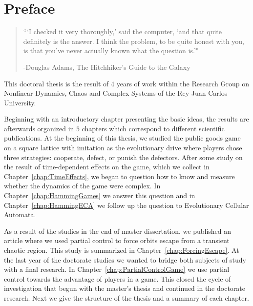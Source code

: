 \chapter*{Preface}


\begin{quotation}

\begin{flushright}
\begin{minipage}[t][5cm][b]{0.5\textwidth}
{ ```I checked it very thoroughly,' said the computer, `and that quite definitely is the answer. I think the
problem, to be quite honest with you, is that you've never actually known what the question is.'"}

\bigskip

-{\small  Douglas Adams, The Hitchhiker’s Guide to the Galaxy}
\end{minipage}
\end{flushright}

\vspace{0.5cm}
\end{quotation}

This doctoral thesis is the result of $4$ years of work within the Research Group on Nonlinear Dynamics, Chaos and Complex Systems of the Rey Juan Carlos University.

Beginning with an introductory chapter presenting the basic ideas, the results are afterwards organized in $5$ chapters which correspond to different scientific publications. At the beginning of this thesis, we studied the public goods game on a square lattice with imitation as the evolutionary drive where players chose three strategies: cooperate, defect, or punish the defectors. After some study on the result of time-dependent effects on the game, which we collect in Chapter~\ref{chap:TimeEffects}, we began to question how to know and measure whether the dynamics of the game were complex. In Chapter~\ref{chap:HammingGames} we answer this question and in Chapter~\ref{chap:HammingECA} we follow up the question to Evolutionary Cellular Automata. 

As a result of the studies in the end of master dissertation, we published an article where we used partial control to force orbits escape from a transient chaotic region. This study is summarized in Chapter~\ref{chap:ForcingEscape}. At the last year of the doctorate studies we wanted to bridge both subjects of study with a final research. In Chapter~\ref{chap:PartialControlGame} we use partial control towards the advantage of players in a game. This closed the cycle of investigation that begun with the master's thesis and continued in the doctorate research. Next we give the structure of the thesis and a summary of each chapter.



